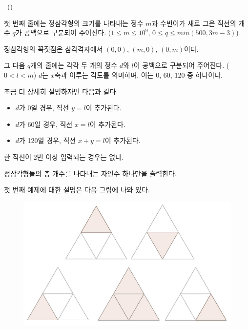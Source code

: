 \begin{problem}{\kcpcpprobtriangle\ (\kcpcpprobtriangleshort)}
    \InputFile
    
    첫 번째 줄에는 정삼각형의 크기를 나타내는 정수 $ m $과 수빈이가 새로 그은 직선의 개수 $ q $가 공백으로 구분되어 주어진다. ($ 1 \leq m \leq 10^9 $, $ 0 \leq q \leq min(500, 3m-3)$)
    
    정삼각형의 꼭짓점은 삼각격자에서 $ (0,0) $, $ (m,0) $, $ (0,m) $이다.
    
    그 다음 $ q $개의 줄에는 각각 두 개의 정수 $ d $와 $ l $이 공백으로 구분되어 주어진다. ($ 0 < l < m $) $ d $는 $ x $축과 이루는 각도를 의미하며, 이는 0, 60, 120 중 하나이다.
    
    조금 더 상세히 설명하자면 다음과 같다.
    
    \begin{itemize}
        \item $ d $가 0일 경우, 직선 $ y=l $이 추가된다.
        \item $ d $가 60일 경우, 직선 $ x=l $이 추가된다.
        \item $ d $가 120일 경우, 직선 $ x+y=l $이 추가된다. 
    \end{itemize}
    
    한 직선이 2번 이상 입력되는 경우는 없다.
    
    \OutputFile
    
    정삼각형들의 총 개수를 나타내는 자연수 하나만을 출력한다.
    
    \Examples
    \begin{example}
    \end{example}

    \Explanation
    첫 번째 예제에 대한 설명은 다음 그림에 나와 있다.
    \begin{figure}[h]
        \centering
        \includegraphics[height=0.25\textheight]{./problems/triangle-pic2.jpg}
    \end{figure}
    
\end{problem}

